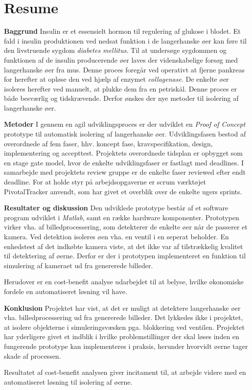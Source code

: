 \section*{Resume}
\textbf{Baggrund}
Insulin er et essensielt hormon til regulering af glukose i blodet. Et fald i insulin produktionen ved nedsat funktion i de langerhanske øer kan føre til den livstruende sygdom \textit{diabetes mellitus}. Til at undersøge sygdommen og funktionen af de insulin producerende øer laves der videnskabelige forsøg med langerhanske øer fra mus. Denne proces foregår ved operativt at fjerne pankreas for herefter at opløse den ved hjælp af enzymet \textit{collagenase}. De enkelte øer isoleres herefter ved manuelt, at plukke dem fra en petriskål. Denne proces er både besværlig og tidskrævende. Derfor ønskes der nye metoder til isolering af langerhanske øer.

\textbf{Metoder} I gennem en agil udviklingsproces er der udviklet en \textit{Proof of Concept} prototype til automatisk isolering af langerhanske øer. Udviklingsfasen bestod af overordnede af fem faser, hhv. koncept fase, kravspecifikation, design, implementering og accepttest. Projektets overordnede tidsplan er opbygget som en stage gate model, hvor de enkelte udviklingsfaser er fastlagt med deadlines. I samarbejde med projektets review gruppe er de enkelte faser reviewed efter endt deadline. For at holde styr på arbejdsopgaverne er scrum værktøjet PivotalTracker anvendt, som har givet et overblik over de enkelte ugers sprints.

\textbf{Resultater og diskussion} Den udviklede prototype består af et software program udviklet i \textit{Matlab}, samt en række hardware komponenter. Prototypen virker vha. af billedprocessering, som detekterer de enkelte øer når de passerer et kamera. Ved detektion isoleres øen vha. en ventil i en seperat beholder. En enhedstest af det indkøbte kamera viste, at det ikke var af tilstrækkelig kvalitet til detektering af øerne. Derfor er der i prototypen implementeret en funktion til simulering af kameraet ud fra genererede billeder.
 
Herudover er en cost-benefit analyse udarbejdet til at belyse, hvilke økonomiske fordele en automatiseret løsning vil have.   


\textbf{Konklusion} Projektet har vist, at det er muligt at detektere langerhanske øer vha. billedprocessering ud fra genererede billeder. Det lykkedes ikke i projektet, at isolere objekterne i simuleringsvæsken pga. blokkering ved ventilen. Projektet har yderligere givet et indblik i hvilke problemstillinger der skal løses inden en fungerende prototype kan implementeres i praksis, herunder hvorvidt øerne tager skade af processen. 

Resultatet af cost-benefit analysen giver incitament til, at arbejde videre med en automatiseret løsning til isolering af øerne. 



